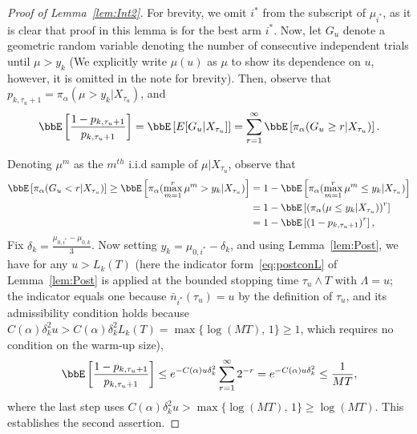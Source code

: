 \documentclass[11pt]{article}
\begin{document}
\begin{proof}[Proof of Lemma~\ref{lem:Int2}]
For brevity, we omit $i^*$ from the subscript of $\mu_{i^*}$, as it is clear that proof in this lemma is for the best arm $i^*$. Now, let $G_u$ denote a geometric random variable denoting the number of consecutive independent trials until $\mu > y_k$ (We explicitly write $\mu(u)$ as $\mu$ to show its dependence on $u$, however, it is omitted in the note for brevity). Then, observe that $p_{k,\tau_{u} +1} = \pi_{\alpha}(\mu > y_k|X_{\tau_{u}})$, and
\begin{align}
    \bbE\left[\frac{1-p_{k,\tau_{u}+1}}{p_{k,\tau_{u}+1}}\right] = \bbE\left[E[G_u|X_{\tau_{u}}]\right] = \sum_{r=1}^{\infty} \bbE\left[\pi_{\alpha}(G_u \geq r|X_{\tau_{u}})\right].
    \label{eq:G1}
\end{align}

Denoting $\mu^{m}$ as the $m^{th}$ i.i.d sample of $\mu|X_{\tau_{u}}$, observe that 
\begin{align}
    \nonumber
    \bbE\left[\pi_{\alpha}(G_u < r|X_{\tau_{u}})\right] \geq \bbE\left[\pi_{\alpha}(\max_{m=1}^{r}\mu^{m} > y_k |X_{\tau_{u}})\right] &= 1- \bbE\left[\pi_{\alpha}(\max_{m=1}^{r}\mu^{m} \leq y_k |X_{\tau_{u}}) \right]
    \\
    &= 1-\bbE\left[\left(\pi_{\alpha}(\mu \leq y_k |X_{\tau_{u}})\right)^{r}\right]
    \nonumber
    \\
    &= 1-\bbE\left[\left(1-p_{k,\tau_u+1}\right)^{r}\right],
    \label{eq:G2}
\end{align}
Fix $\delta_k=\frac{\mu_{0,i^*}- \mu_{0,k}}{3}$. Now setting $y_k=\mu_{0,i^*}-\delta_k$, and using Lemma~\ref{lem:Post}, we have for any $u > L_k(T)$ (here the indicator form~\eqref{eq:postconL} of Lemma~\ref{lem:Post} is applied at the bounded stopping time $\tau_u \wedge T$ with $\Lambda = u$; the indicator equals one because $\bar n_{i^*}(\tau_u) = u$ by the definition of $\tau_u$, and its admissibility condition holds because $C(\alpha)\delta_k^2 u > C(\alpha)\delta_k^2 L_k(T) = \max\{\log(MT),\,1\} \geq 1$, which requires no condition on the warm-up size),  
\begin{align*}
    \bbE \left[   \frac{1-p_{k,\tau_{u}+1}}{p_{k,\tau_{u}+1}}     \right] \leq e^{- C(\alpha)u\delta_k^2} \sum_{r=1}^{\infty} 2^{-r} =  e^{- C(\alpha)u\delta_k^2} \leq \frac{1}{MT},
\end{align*}
where the last step uses $C(\alpha)\delta_k^2 u > \max\{\log(MT),\,1\} \geq \log(MT)$. This establishes the second assertion.


\end{proof}
\end{document}
